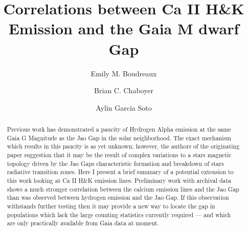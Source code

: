 \documentclass[twocolumn]{aastex62}
\begin{document}
\title{Correlations between Ca II H\&K Emission and the Gaia M dwarf Gap}


\author[0000-0002-2600-7513]{Emily M. Boudreaux}

\author[0000-0003-3096-4161]{Brian C. Chaboyer}

\author[0000-0001-9828-3229]{Aylin Garcia Soto}

\received{}
\revised{}
\revised{}
\accepted{}


\begin{abstract}
Previous work has demonstrated a paucity of Hydrogen Alpha emission at the same
  Gaia G Magnitude as the Jao Gap in the solar neighborhood. The exact
  mechanism which results in this paucity is as yet unknown; however, the
  authors of the originating paper suggestion that it may be the result of
  complex variations to a stars magnetic topology driven by the Jao Gaps
  characteristic formation and breakdown of stars radiative transition zones.
  Here I present a brief summary of a potential extension to this work looking
  at Ca II H\&K emission lines. Preliminary work with archival data shows a
  much stronger correlation between the calcium emission lines and the Jao Gap
  than was observed between hydrogen emission and the Jao Gap. If this
  observation withstands further testing then it may provide a new way to
  locate the gap in populations which lack the large counting statistics
  currently required --- and which are only practically available from Gaia
  data at moment.

\end{abstract}












\acknowledgments
\end{document}

